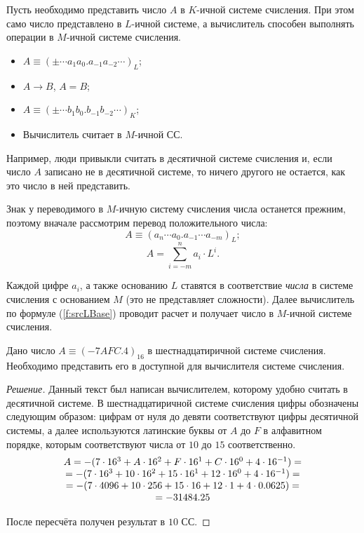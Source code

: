 Пусть необходимо представить число $A$ в $K$-ичной системе счисления. При этом само число представлено в $L$-ичной системе, а вычислитель способен выполнять операции в $M$-ичной системе счисления.

\begin{itemize}
    \item $A\equiv(\pm\cdots a_1a_0.a_{-1}a_{-2}\cdots)_L$;
    \item $A\to B$, $A=B$;
    \item $A\equiv(\pm\cdots b_1b_0.b_{-1}b_{-2}\cdots)_K$;
    \item Вычислитель считает в $M$-ичной СС.
\end{itemize}

Например, люди привыкли считать в десятичной системе счисления и, если число $A$ записано не в десятичной системе, то ничего другого не остается, как это число в ней представить.

Знак у переводимого в $M$-ичную систему счисления числа останется прежним, поэтому вначале рассмотрим перевод положительного числа:
\[
    A\equiv(a_{n}\cdots a_{0}.a_{-1}\cdots a_{-m})_L;
\]
\begin{equation}\label{f:srcLBase}
    A=\sum_{i=-m}^{n}a_i\cdot L^{i}.
\end{equation}

Каждой цифре $a_{i}$, а также основанию $L$ ставятся в соответствие \emph{числа} в системе счисления с основанием $M$ (это не представляет сложности). Далее вычислитель по формуле (\ref{f:srcLBase}) проводит расчет и получает число в $M$-ичной системе счисления.

\begin{exampl}[Задача]
    Дано число $A\equiv(-7AFC.4)_{16}$ в шестнадцатиричной системе счисления. Необходимо представить его в доступной для вычислителя системе счисления.
\end{exampl}
\begin{proof}[Решение]
    Данный текст был написан вычислителем, которому удобно считать в десятичной системе. В шестнадцатиричной системе счисления цифры обозначены следующим образом: цифрам от нуля до девяти соответствуют цифры десятичной системы, а далее используются латинские буквы от $A$ до $F$ в алфавитном порядке, которым соответствуют числа от $10$ до $15$ соответственно.
    \[
        \begin{array}[c]{c}
            A=-(
            7\cdot 16^{3}+
            A\cdot 16^{2}+
            F\cdot 16^{1}+
            C\cdot 16^{0}+
            4\cdot 16^{-1})=\\
            =-(
            7\cdot 16^{3}+
            10\cdot 16^{2}+
            15\cdot 16^{1}+
            12\cdot 16^{0}+
            4\cdot 16^{-1})=\\
            =
            -(7\cdot 4096+
            10\cdot 256+
            15\cdot 16+
            12\cdot 1+
            4\cdot 0.0625)=\\
            = -31484.25
        \end{array}
    \]
    
    После пересчёта получен результат в $10$ СС.
\end{proof}

